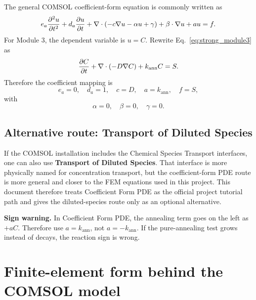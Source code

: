 \documentclass[11pt]{article}
\begin{document}
The general COMSOL coefficient-form equation is commonly written as
\begin{equation}
 e_a \pdv[2]{u}{t}
 +d_a \pdv{u}{t}
 +\nabla\cdot\left(-c\nabla u-\alpha u+\gamma\right)
 +\beta\cdot\nabla u
 +a u
 =f.
\label{eq:comsol_coeff_general}
\end{equation}
For Module 3, the dependent variable is $u=C$. Rewrite Eq.~\eqref{eq:strong_module3} as
\begin{equation}
\pdv{C}{t}+\nabla\cdot(-D\nabla C)+k_{\mathrm{ann}}C=S.
\label{eq:coeff_target}
\end{equation}
Therefore the coefficient mapping is
\begin{equation}
\boxed{e_a=0,\quad d_a=1,\quad c=D,\quad a=k_{\mathrm{ann}},\quad f=S,}
\end{equation}
with
\begin{equation}
\boxed{\alpha=0,\quad \beta=0,\quad \gamma=0.}
\end{equation}

\subsection{Alternative route: Transport of Diluted Species}

If the COMSOL installation includes the Chemical Species Transport interfaces, one can also use \textbf{Transport of Diluted Species}. That interface is more physically named for concentration transport, but the coefficient-form PDE route is more general and closer to the FEM equations used in this project. This document therefore treats Coefficient Form PDE as the official project tutorial path and gives the diluted-species route only as an optional alternative.

\begin{notebox}
\textbf{Sign warning.} In Coefficient Form PDE, the annealing term goes on the left as $+aC$. Therefore use $a=k_{\mathrm{ann}}$, not $a=-k_{\mathrm{ann}}$. If the pure-annealing test grows instead of decays, the reaction sign is wrong.
\end{notebox}

\section{Finite-element form behind the COMSOL model}
\end{document}
